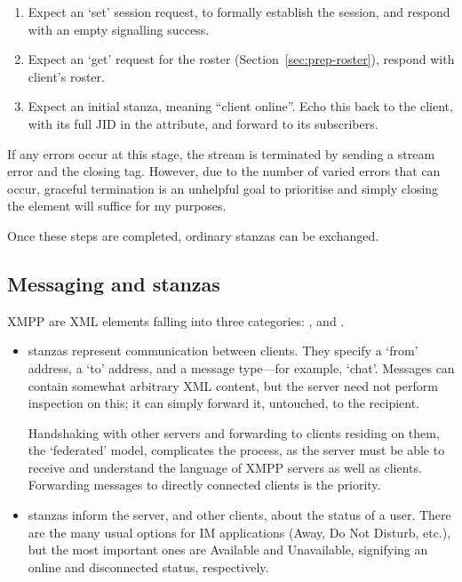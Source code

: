 \documentclass[12pt,a4paper,twoside,openright]{report}
\begin{document}
{\begin{enumerate}
  \item Expect an  `set' session request, to formally establish the session, and respond with an empty  signalling success.

  \item Expect an  `get' request for the roster (Section~\ref{sec:prep-roster}), respond with client's roster.

  \item Expect an initial  stanza, meaning ``client online''. Echo this back to the client, with its full JID in the  attribute, and forward to its subscribers.
\end{enumerate}

If any errors occur at this stage, the stream is terminated by sending a stream error and the closing  tag. However, due to the number of varied errors that can occur, graceful termination is an unhelpful goal to prioritise and simply closing the  element will suffice for my purposes.

Once these steps are completed, ordinary stanzas can be exchanged.

\subsection{Messaging and stanzas}
XMPP  are XML elements falling into three categories: ,  and .

\begin{itemize}
  \item {} stanzas represent communication between clients. They specify a `from' address, a `to' address, and a message type---for example, `chat'. Messages can contain somewhat arbitrary XML content, but the server need not perform inspection on this; it can simply forward it, untouched, to the recipient.

  Handshaking with other servers and forwarding to clients residing on them, the `federated' model, complicates the process, as the server must be able to receive and understand the language of XMPP servers as well as clients. Forwarding messages to directly connected clients is the priority.

  \item {} stanzas inform the server, and other clients, about the status of a user. There are the many usual options for IM applications (Away, Do Not Disturb, etc.), but the most important ones are Available and Unavailable, signifying an online and disconnected status, respectively.


\end{itemize}}
\end{document}

